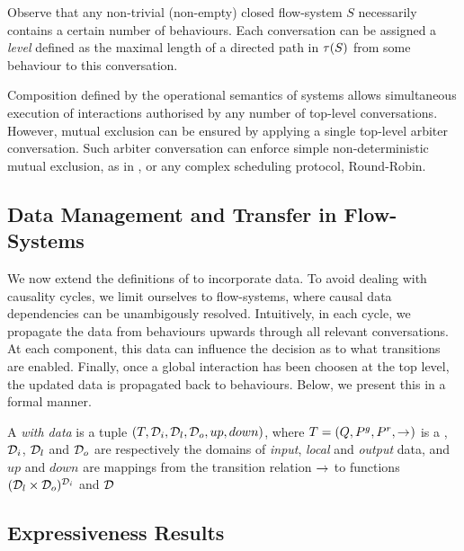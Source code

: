 Observe that any non-trivial (\ie non-empty) closed flow-system $S$
necessarily contains a certain number of behaviours.  Each conversation can
be assigned a {\em level} defined as the maximal length of a directed path
in $\topo{S}$ from some behaviour to this conversation.

Composition defined by the operational semantics of systems allows
simultaneous execution of interactions authorised by any number of
top-level conversations.  However, mutual exclusion can be ensured by
applying a single top-level arbiter conversation.  Such arbiter
conversation can enforce simple non-deterministic mutual exclusion, as in
, or any complex scheduling protocol, \eg Round-Robin.


\subsection{Data Management and Transfer in Flow-Systems}
\label{sec:data}

We now extend the definitions of  to incorporate data.  To
avoid dealing with causality cycles, we limit ourselves to flow-systems,
where causal data dependencies can be unambigously resolved.  Intuitively,
in each cycle, we propagate the data from behaviours upwards through all
relevant conversations.  At each component, this data can influence the
decision as to what transitions are enabled.  Finally, once a global
interaction has been choosen at the top level, the updated data is
propagated back to behaviours.  Below, we present this in a formal manner.

\begin{definition}
  A {\em \compmodel{} with data} is a tuple $(T, \data[i], \data[l],
  \data[o], up, down)$, where $T = (Q, \pin, \pout, \goesto)$ is a
  \compmodel{}, $\data[i]$, $\data[l]$ and $\data[o]$ are respectively the
  domains of {\em input}, {\em local} and {\em output} data, and $up$ and
  $down$ are mappings from the transition relation $\goesto$ to
  functions $(\data[l] \times \data[o])^{\data[i]}$ and $\data$
\end{definition}

\subsection{Expressiveness Results}
\label{sec:expressiveness}


